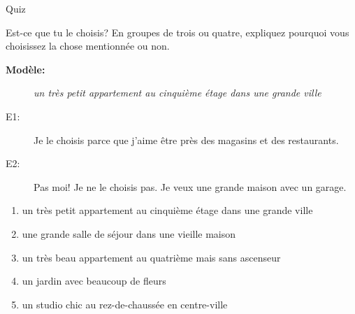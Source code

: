 \documentclass{beamer}
\begin{document}
  \begin{frame}{}
    \begin{center}
      \Large Quiz
    \end{center}
  \end{frame}

  \begin{frame}{Est-ce que tu le choisis?}
    \small
    En groupes de trois ou quatre, expliquez pourquoi vous choisissez la chose mentionnée ou non.
    \begin{description}
      \item[\textbf{Modèle:}] \emph{un très petit appartement au cinquième étage dans une grande ville}
      \item[E1:] Je le choisis parce que j'aime être près des magasins et des restaurants.
      \item[E2:] Pas moi! Je ne le choisis pas. Je veux une grande maison avec un garage.
    \end{description}
    \begin{enumerate}
      \item un très petit appartement au cinquième étage dans une grande ville
      \item une grande salle de séjour dans une vieille maison
      \item un très beau appartement au quatrième mais sans ascenseur
      \item un jardin avec beaucoup de fleurs
      \item un studio chic au rez-de-chaussée en centre-ville
    \end{enumerate}
  \end{frame}
\end{document}
